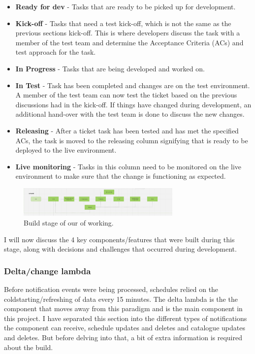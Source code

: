   \begin{itemize}
    \item \textbf{Ready for dev} - Tasks that are ready to be picked up for development.
    \item \textbf{Kick-off} - Tasks that need a test kick-off, which is not the same as the previous sections kick-off. This is where developers
    discuss the task with a member of the test team and determine the Acceptance Criteria (ACs) and test approach for the task.
    \item \textbf{In Progress} - Tasks that are being developed and worked on.
    \item \textbf{In Test} - Task has been completed and changes are on the test environment. A member of the test team can now test the ticket
    based on the previous discussions had in the kick-off. If things have changed during development, an additional hand-over with the test team 
    is done to discuss the new changes.
    \item \textbf{Releasing} - After a ticket task has been tested and has met the specified ACs, the task is moved to the releasing column signifying 
    that is ready to be deployed to the live environment.
    \item \textbf{Live monitoring} - Tasks in this column need to be monitored on the live environment to make sure that the change is functioning as expected.
  \end{itemize}

  \begin{figure}[H]
    \centering
    \includegraphics[width=8cm]{assets/workflow/build.png}
    \caption{Build stage of our of working.}
    \label{fig:workflowBuild}
  \end{figure}

  I will now discuss the 4 key components/features that were built during this stage, along with decisions and challenges that occurred during development.

  \newpage
  \subsubsection{Delta/change lambda}
  Before notification events were being processed, schedules relied on the coldstarting/refreshing of data every 15 minutes. The delta lambda is the 
  the component that moves away from this paradigm and is the main component in this project. I have separated this section into the different types
  of notifications the component can receive, schedule updates and deletes and catalogue updates and deletes. But before delving into that, a bit of extra
  information is required about the build.

